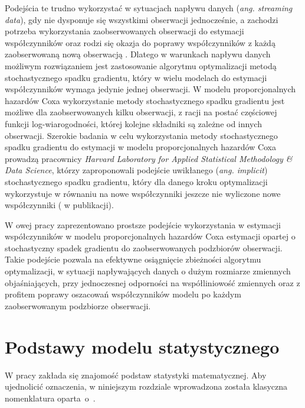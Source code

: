 Podejścia te trudno wykorzystać w sytuacjach napływu danych (\textit{ang. streaming data}), gdy nie dysponuje się wszystkimi obserwacji jednocześnie, a zachodzi potrzeba wykorzystania zaobserwowanych obserwacji do estymacji współczynników oraz rodzi się okazja do poprawy współczynników z każdą zaobserwowaną nową obserwacją \cite{bottDOD}. Dlatego w warunkach napływu danych możliwym rozwiązaniem jest zastosowanie algorytmu optymalizacji metodą stochastycznego spadku gradientu, który w wielu modelach do estymacji współczynników wymaga jedynie jednej obserwacji. W modelu proporcjonalnych hazardów Coxa wykorzystanie metody stochastycznego spadku gradientu jest możliwe dla zaobserwowanych kilku obserwacji, z racji na postać częściowej funkcji log-wiarogodności, której kolejne składniki są zależne od innych obserwacji. Szerokie badania w celu wykorzystania metody stochastycznego spadku gradientu do estymacji w modelu proporcjonalnych hazardów Coxa prowadzą pracownicy \textit{Harvard Laboratory for Applied Statistical Methodology \& Data Science}, którzy zaproponowali podejście uwikłanego (\textit{ang. implicit}) stochastycznego spadku gradientu, który dla danego kroku optymalizacji wykorzystuje w równaniu na nowe współczynniki jeszcze nie wyliczone nowe współczynniki (\cite{toulis} w publikacji).  

 W owej pracy zaprezentowano prostsze podejście wykorzystania w estymacji współczynników w modelu proporcjonalnych hazardów Coxa estymacji opartej o stochastyczny spadek gradientu do zaobserwowanych podzbiorów obserwacji. Takie podejście pozwala na efektywne osiągnięcie zbieżności algorytmu optymalizacji, w sytuacji napływających danych o dużym rozmiarze zmiennych objaśniających, przy jednoczesnej odporności na współliniowość zmiennych oraz z profitem poprawy oszacowań współczynników modelu po każdym zaobserwowanym podzbiorze obserwacji.


\chapter*{Podstawy modelu statystycznego}

W pracy zakłada się znajomość podstaw statystyki matematycznej. Aby ujednolicić oznaczenia, w niniejszym rozdziale wprowadzona została klasyczna nomenklatura oparta~o~\cite{niemiro}.

